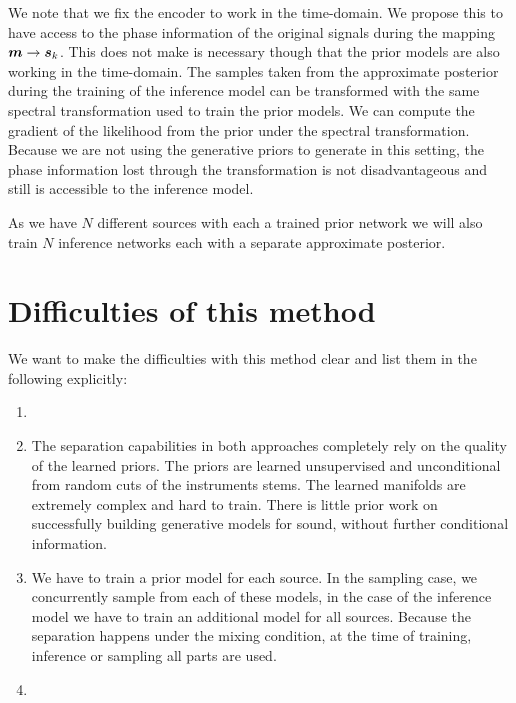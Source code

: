 We note that we fix the encoder to work in the time-domain. We propose this to have access to the phase information of the original signals during the mapping \(\m \to \s_k\). This does not make is necessary though that the prior models are also working in the time-domain. The samples taken from the approximate posterior during the training of the inference model can be transformed with the same spectral transformation used to train the prior models. We can compute the gradient of the likelihood from the prior under the spectral transformation. Because we are not using the generative priors to generate in this setting, the phase information lost through the transformation is not disadvantageous and still is accessible to the inference model.

As we have \(N\) different sources with each a trained prior network we will also train \(N\) inference networks each with a separate approximate posterior.

\section{Difficulties of this method}
We want to make the difficulties with this method clear and list them in the following explicitly:

\begin{enumerate}
    \item {}
    \item The separation capabilities in both approaches completely rely on the quality of the learned priors. The priors are learned unsupervised and unconditional from random cuts of the instruments stems. The learned manifolds are extremely complex and hard to train. There is little prior work on successfully building generative models for sound, without further conditional information.
    \item We have to train a prior model for each source. In the sampling case, we concurrently sample from each of these models, in the case of the inference model we have to train an additional model for all sources. Because the separation happens under the mixing condition, at the time of training, inference or sampling all parts are used.
    \item {}
\end{enumerate}
